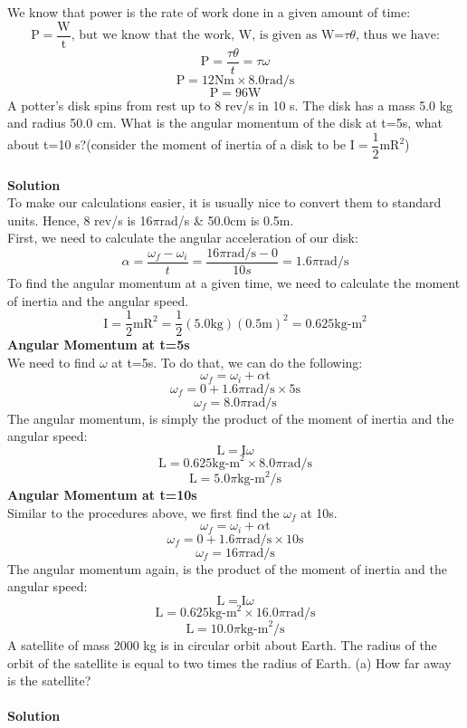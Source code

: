 \documentclass[9pt,addpoints]{exam}
\begin{document}
\begin{questions}
		We know that power is the rate of work done in a given amount of time:
		$$\text{P}=\dfrac{\text{W}}{\text{t}}\text{, but we know that the work, W, is given as W=}\tau\theta\text{, thus we have:}$$
		$$\text{P}=\dfrac{\tau\theta}{t}=\tau\omega$$
		$$\text{P}=12\text{Nm}\times8.0\text{rad/s}$$
		$$\text{P}=96\text{W}$$
		\question A potter’s disk spins from rest up to 8 rev/s in 10 s. The disk has a mass 5.0 kg and radius 50.0 cm. What is the angular momentum of the disk at  t=5s, what about t=10 s?(consider the moment of inertia of a disk to be $\text{I}=\dfrac{1}{2}\text{mR}^2$) \\ \\
		\textbf{Solution} \\
		To make our calculations easier, it is usually nice to convert them to standard units. Hence, 8 rev/s is 16$\pi$rad/s \& 50.0cm is 0.5m. \\
		First, we need to calculate the angular acceleration of our disk:
		$$\alpha=\dfrac{\omega_f-\omega_i}{t}=\dfrac{16\pi\text{rad/s}-0}{10s}=1.6\pi\text{rad/s}$$
		To find the angular momentum at a given time, we need to calculate the moment of inertia and the angular speed.
		$$\text{I}=\dfrac{1}{2}\text{mR}^2=\dfrac{1}{2}(5.0\text{kg})(0.5\text{m})^2=0.625\text{kg-m}^2$$
		\textbf{Angular Momentum at t=5s} \\
		We need to find $\omega$ at t=5s. To do that, we can do the following:
		$$\omega_f=\omega_i+\alpha\text{t}$$
		$$\omega_f=0+1.6\pi\text{rad/s}\times5\text{s}$$
		$$\omega_f=8.0\pi\text{rad/s}$$
		The angular momentum, is simply the product of the moment of inertia and the angular speed:
		$$\text{L}=\text{I}\omega$$
		$$\text{L}=0.625\text{kg-m}^2\times8.0\pi\text{rad/s}$$	
		$$\text{L}=5.0\pi\text{kg-m}^2/\text{s}$$
		\textbf{Angular Momentum at t=10s} \\
		Similar to the procedures above, we first find the $\omega_f$ at 10s.
		$$\omega_f=\omega_i+\alpha\text{t}$$
		$$\omega_f=0+1.6\pi\text{rad/s}\times10\text{s}$$
		$$\omega_f=16\pi\text{rad/s}$$
		The angular momentum again, is the product of the moment of inertia and the angular speed:
		$$\text{L}=\text{I}\omega$$
		$$\text{L}=0.625\text{kg-m}^2\times16.0\pi\text{rad/s}$$	
		$$\text{L}=10.0\pi\text{kg-m}^2/\text{s}$$
		\question A satellite of mass 2000 kg is in circular orbit about Earth. The radius of the orbit of the satellite is equal to two times the radius of Earth. (a) How far away is the satellite? \\ \\
		\textbf{Solution} \\

\end{questions}
\end{document}
